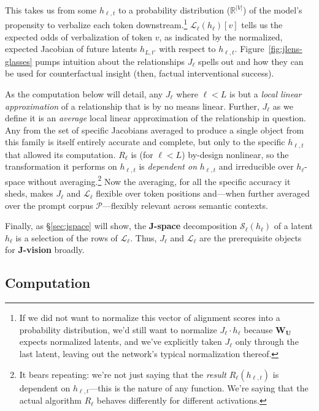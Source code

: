 \documentclass{article}
\newcommand{\jlens}{\mathscr{L}}
\newcommand{\jspace}{\mathscr{S}}
\begin{document}
This takes us from some \(h_{\ell,t}\) to a probability distribution (\(\mathbb{R}^{|V|}\)) of the model's propensity to verbalize each token downstream.\footnote{If we did not want to normalize this vector of alignment scores into a probability distribution, we'd still want to normalize \(J_\ell \cdot h_\ell\) because \(\mathbf{W_U}\) expects normalized latents, and we've explicitly taken \(J_\ell\) only through the last latent, leaving out the network's typical normalization thereof.} \(\jlens_\ell(h_\ell)[v]\) tells us the expected odds of verbalization of token \(v\), as indicated by the normalized, expected Jacobian of future latents \(h_{L,t'}\) with respect to \(h_{\ell,t}\). Figure~\ref{fig:jlens-glasses} pumps intuition about the relationships \(J_\ell\) spells out and how they can be used for counterfactual insight (then, factual interventional success). 

As the computation below will detail, any \(J_\ell\) where \(\ell < L\) is but a \textit{local linear approximation} of a relationship that is by no means linear. Further, \(J_\ell\) as we define it is an \textit{average} local linear approximation of the relationship in question. Any from the set of specific Jacobians averaged to produce a single object from this family is itself entirely accurate and complete, but only to the specific \(h_{\ell,t}\) that allowed its computation. \(R_\ell\) is (for \(\ell < L\)) by-design nonlinear, so the transformation it performs on \(h_{\ell,t}\) is \textit{dependent on} \(h_{\ell,t}\) and irreducible over \(h_{\ell}\)-space without averaging.\footnote{It bears repeating: we're not just saying that the \textit{result} \(R_\ell(h_{\ell,t})\) is dependent on \(h_{\ell,t}\)---this is the nature of any function. We're saying that the actual algorithm \(R_\ell\) behaves differently for different activations.} Now the averaging, for all the specific accuracy it sheds, makes \(J_{\ell}\) and \(\jlens_\ell\) flexible over token positions and---when further averaged over the prompt corpus \(\mathscr{P}\)---flexibly relevant across semantic contexts. 

Finally, as \S\ref{sec:jspace} will show, the \textbf{J-space} decomposition \(\jspace_{\ell}(h_\ell)\) of a latent \(h_{\ell}\) is a selection of the rows of \(\jlens_{\ell}\). Thus, \(J_{\ell}\) and \(\jlens_{\ell}\) are the prerequisite objects for \textbf{J-vision} broadly.

\subsection{Computation}\label{sec:jcomp}
\end{document}
